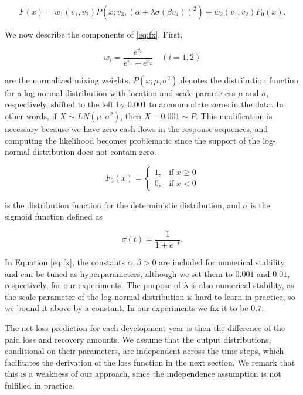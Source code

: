\documentclass{article}
\begin{document}
\begin{equation} \label{eq:fx}
    F(x) = w_1(v_1, v_2)P(x; v_3, (\alpha + \lambda\sigma(\beta v_4))^2) + w_2(v_1, v_2)F_0(x).
\end{equation}

We now describe the components of \ref{eq:fx}. First, 

\begin{equation}
    w_i = \frac{e^{v_i}}{e^{v_1} + e^{v_2}}\quad (i = 1, 2)
\end{equation}

are the normalized mixing weights. $P(x; \mu, \sigma^2)$ denotes the distribution function for a log-normal distribution with location and scale parameters $\mu$ and $\sigma$, respectively, shifted to the left by 0.001 to accommodate zeros in the data. In other words, if $X \sim LN(\mu, \sigma^2)$, then $X - 0.001 \sim P$. This modification is necessary because we have zero cash flows in the response sequences, and computing the likelihood becomes problematic since the support of the log-normal distribution does not contain zero.

\begin{equation}
    F_{0}(x)=\left\{\begin{matrix} 1, & \mbox{if }x\ge 0 \\ 0, & \mbox{if }x<0 \end{matrix}\right.
\end{equation}

is the distribution function for the deterministic distribution, and $\sigma$ is the sigmoid function defined as

\begin{equation}
    \sigma(t) = \frac{1}{1 + e^{-t}}.
\end{equation}

In Equation \ref{eq:fx}, the constants $\alpha, \beta > 0$ are included for numerical stability and can be tuned as hyperparameters, although we set them to $0.001$ and $0.01$, respectively, for our experiments. The purpose of $\lambda$ is also numerical stability, as the scale parameter of the log-normal distribution is hard to learn in practice, so we bound it above by a constant. In our experiments we fix it to be $0.7$.

The net loss prediction for each development year is then the difference of the paid loss and recovery amounts. We assume that the output distributions, conditional on their parameters, are independent across the time steps, which facilitates the derivation of the loss function in the next section. We remark that this is a weakness of our approach, since the independence assumption is not fulfilled in practice.
\end{document}
